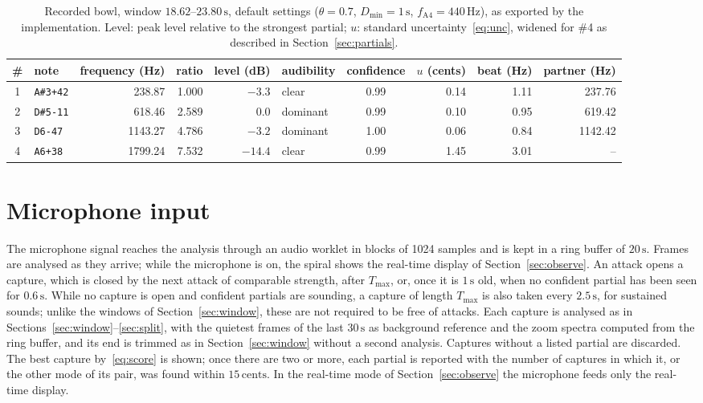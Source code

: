 \documentclass[10pt,a4paper,twocolumn]{article}
\newcommand{\Hz}{\,\mathrm{Hz}}
\newcommand{\s}{\,\mathrm{s}}
\newcommand{\ct}{\,\mathrm{cents}}
\begin{document}
\begin{table}[t]
\centering
\caption{Recorded bowl, window $18.62$--$23.80\s$, default settings ($\theta = 0.7$, $D_{\min} = 1\s$, $f_{\mathrm{A4}} = 440\Hz$), as exported by the implementation. Level: peak level relative to the strongest partial; $u$: standard uncertainty~\eqref{eq:unc}, widened for \#4 as described in Section~\ref{sec:partials}.}
\label{tab:bowl}
\small
\begin{tabular}{@{}clrrrlcrrr@{}}
\toprule
\# & note & frequency (Hz) & ratio & level (dB) & audibility & confidence & $u$ (cents) & beat (Hz) & partner (Hz)\\
\midrule
1 & \texttt{A\#3+42} & 238.87 & 1.000 & $-3.3$ & clear & 0.99 & 0.14 & 1.11 & 237.76\\
2 & \texttt{D\#5-11} & 618.46 & 2.589 & $0.0$ & dominant & 0.99 & 0.10 & 0.95 & 619.42\\
3 & \texttt{D6-47} & 1143.27 & 4.786 & $-3.2$ & dominant & 1.00 & 0.06 & 0.84 & 1142.42\\
4 & \texttt{A6+38} & 1799.24 & 7.532 & $-14.4$ & clear & 0.99 & 1.45 & 3.01 & --\\
\bottomrule
\end{tabular}
\end{table}

\section{Microphone input}
\label{sec:mic}

The microphone signal reaches the analysis through an audio worklet in blocks of 1024 samples and is kept in a ring buffer of $20\s$. Frames are analysed as they arrive; while the microphone is on, the spiral shows the real-time display of Section~\ref{sec:observe}. An attack opens a capture, which is closed by the next attack of comparable strength, after $T_{\max}$, or, once it is $1\s$ old, when no confident partial has been seen for $0.6\s$. While no capture is open and confident partials are sounding, a capture of length $T_{\max}$ is also taken every $2.5\s$, for sustained sounds; unlike the windows of Section~\ref{sec:window}, these are not required to be free of attacks. Each capture is analysed as in Sections~\ref{sec:window}--\ref{sec:split}, with the quietest frames of the last $30\s$ as background reference and the zoom spectra computed from the ring buffer, and its end is trimmed as in Section~\ref{sec:window} without a second analysis. Captures without a listed partial are discarded. The best capture by~\eqref{eq:score} is shown; once there are two or more, each partial is reported with the number of captures in which it, or the other mode of its pair, was found within $15\ct$. In the real-time mode of Section~\ref{sec:observe} the microphone feeds only the real-time display.
\end{document}
